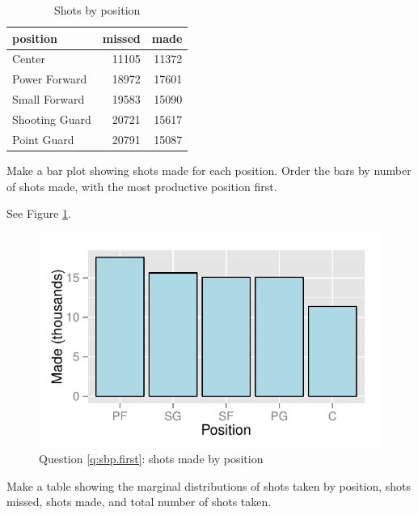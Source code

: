 \documentclass[letterpaper, landscape]{exam}
\begin{document}
\begin{questions}
{        \begin{table}[H]
          \centering
          \begin{tabular}{lrr}
            \toprule
            position       & missed & made \\
            \midrule
            Center         & 11105  & 11372 \\
            Power Forward  & 18972  & 17601 \\
            Small Forward  & 19583  & 15090 \\
            Shooting Guard & 20721  & 15617 \\
            Point Guard    & 20791  & 15087 \\
            \bottomrule
          \end{tabular}
          \caption{Shots by position}
          \label{tab:sbp}
        \end{table}
      }

      \question[5] Make a bar plot showing shots made for each position.  Order
        the bars by number of shots made, with the most productive position first.
        \label{q:sbp.first}

        \begin{solution}
          See Figure \ref{fig:sbp}.
        \end{solution}

        \ifprintanswers
          \begin{figure}[H]
            \centering
            \includegraphics{figures/shots_made.pdf}
            \caption{Question \ref{q:sbp.first}: shots made by position}
            \label{fig:sbp}
          \end{figure}
        \fi

      \question[5] Make a table showing the marginal distributions of shots
      taken by position, shots missed, shots made, and total number of shots
      taken.


\end{questions}
\end{document}
